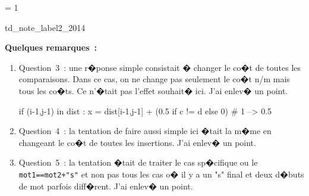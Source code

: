 \ifnum\correctionenonce = 1

\begin{xdemoexonot}{td_note_label2_2014}


\textbf{Quelques remarques~:}

\begin{enumerate}
\item Question~3~: une r�ponse simple consistait � changer le co�t de toutes les comparaisons. Dans ce cas, on ne change pas seulement le co�t n/m mais tous les co�ts. Ce n'�tait pas l'effet souhait� ici. J'ai enlev� un point.

\begin{verbatimx}
            if (i-1,j-1) in dist :
                x = dist[i-1,j-1] + (0.5 if c != d else 0)  # 1 --> 0.5
\end{verbatimx}

\item Question~4~: la tentation de faire aussi simple ici �tait la m�me en changeant le co�t de toutes les insertions. J'ai enlev� un point.

\item Question~5~: la tentation �tait de traiter le cas sp�cifique ou le \texttt{mot1==mot2+"s"} et non pas tous les cas o� il y a un "s" final et deux d�buts de mot parfois diff�rent. J'ai enlev� un point.

\end{enumerate}

\end{xdemoexonot}
\fi




\firstpassagedo{
\newpage
\sametextforthisinterro
}





